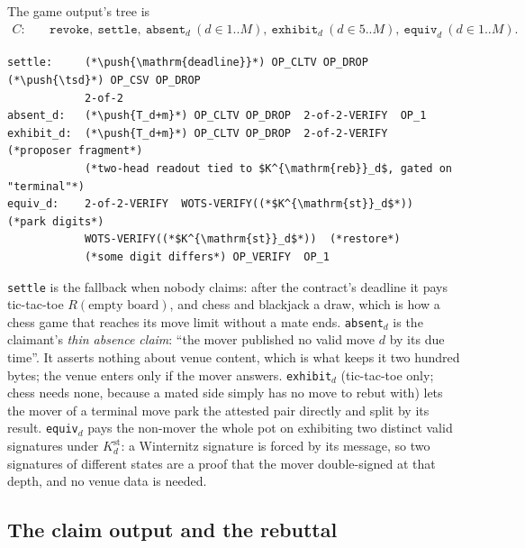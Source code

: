 \documentclass[11pt]{article}
\newcommand{\push}[1]{\ensuremath{\langle #1\rangle}}
\newcommand{\tsd}{\Delta}
\begin{document}
The game output's tree is
\begin{align*}
  C:\quad & \texttt{revoke},\ \texttt{settle},\
  \texttt{absent}_d\ (d \in 1..M),\ \texttt{exhibit}_d\ (d \in 5..M),\
  \texttt{equiv}_d\ (d \in 1..M).
\end{align*}
\begin{lstlisting}[style=script]
settle:     (*\push{\mathrm{deadline}}*) OP_CLTV OP_DROP  (*\push{\tsd}*) OP_CSV OP_DROP
            2-of-2
absent_d:   (*\push{T_d+m}*) OP_CLTV OP_DROP  2-of-2-VERIFY  OP_1
exhibit_d:  (*\push{T_d+m}*) OP_CLTV OP_DROP  2-of-2-VERIFY  (*proposer fragment*)
            (*two-head readout tied to $K^{\mathrm{reb}}_d$, gated on "terminal"*)
equiv_d:    2-of-2-VERIFY  WOTS-VERIFY((*$K^{\mathrm{st}}_d$*))  (*park digits*)
            WOTS-VERIFY((*$K^{\mathrm{st}}_d$*))  (*restore*)
            (*some digit differs*) OP_VERIFY  OP_1
\end{lstlisting}
\texttt{settle} is the fallback when nobody claims: after the
contract's deadline it pays tic-tac-toe $R(\text{empty board})$, and
chess and blackjack a draw, which is how a chess game that reaches its
move limit without a mate ends. \texttt{absent}$_d$ is
the claimant's \emph{thin absence claim}: ``the mover published no valid
move $d$ by its due time''. It asserts nothing about venue content, which is
what keeps it two hundred bytes; the venue enters only if the mover
answers. \texttt{exhibit}$_d$ (tic-tac-toe only; chess needs none,
because a mated side simply has no move to rebut with) lets the mover
of a terminal move park the attested pair directly and split by its
result. \texttt{equiv}$_d$ pays the non-mover the whole pot on
exhibiting two distinct valid signatures under $K^{\mathrm{st}}_d$: a
Winternitz signature is forced by its message, so two signatures of
different states are a proof that the mover double-signed at that
depth, and no venue data is needed.

\subsection{The claim output and the rebuttal}
\label{sec:graph:claim}
\end{document}

